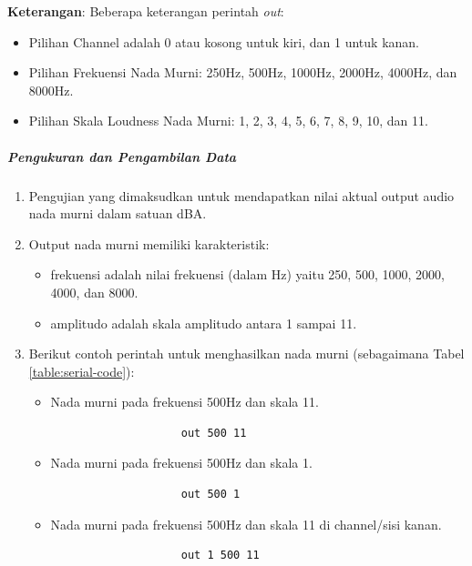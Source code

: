 \documentclass{article}
\begin{document}
	\textbf{Keterangan}: Beberapa keterangan perintah \textit{out}:
	\begin{itemize}
		\item Pilihan Channel adalah 0 atau kosong untuk kiri, dan 1 untuk kanan.
		\item Pilihan Frekuensi Nada Murni: 250Hz, 500Hz, 1000Hz, 2000Hz, 4000Hz, dan 8000Hz.
		\item Pilihan Skala Loudness Nada Murni: 1, 2, 3, 4, 5, 6, 7, 8, 9, 10, dan 11.
	\end{itemize}
	
	\subparagraph{Pengukuran dan Pengambilan Data}
		
		\begin{enumerate}
			\item Pengujian yang dimaksudkan untuk mendapatkan nilai aktual output audio nada murni dalam satuan dBA.
			
			\item Output nada murni memiliki karakteristik:
			\begin{itemize}
				\item frekuensi adalah nilai frekuensi (dalam Hz) yaitu 250, 500, 1000, 2000, 4000, dan 8000.
				\item amplitudo adalah skala amplitudo antara 1 sampai 11.
			\end{itemize}
		
			\item Berikut contoh perintah untuk menghasilkan nada murni (sebagaimana Tabel \ref{table:serial-code}):
			
			\begin{itemize}
				\item Nada murni pada frekuensi 500Hz dan skala 11.
				\begin{verbatim}
					out 500 11
				\end{verbatim}
				
				\item Nada murni pada frekuensi 500Hz dan skala 1.
				\begin{verbatim}
					out 500 1
				\end{verbatim}
				
				\item Nada murni pada frekuensi 500Hz dan skala 11 di channel/sisi kanan.
				\begin{verbatim}
					out 1 500 11
				\end{verbatim}
				

\end{itemize}
\end{enumerate}
\end{document}

